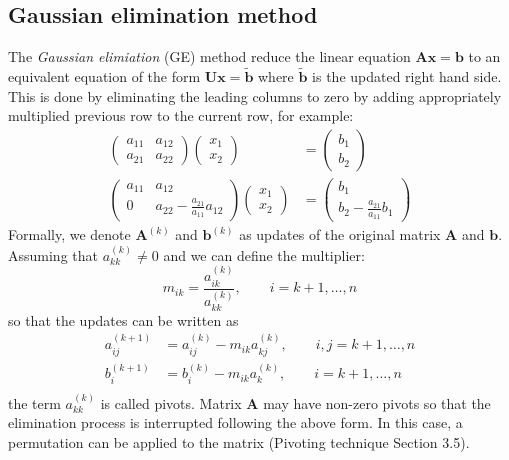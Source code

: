 \documentclass{article}
\begin{document}
\subsection{Gaussian elimination method}
The \emph{Gaussian elimiation} (GE) method reduce the linear equation 
$\mathbf{A}\mathbf{x} = \mathbf{b}$ to an equivalent equation 
of the form $\mathbf{U}\mathbf{x} = \tilde{\mathbf{b}}$ where $\tilde{\mathbf{b}}$
is the updated right hand side. 
This is done by eliminating the leading columns to zero by adding appropriately multiplied 
previous row to the current row, for example:
\begin{align*}
    \left(\begin{matrix}
        a_{11} & a_{12} \\
        a_{21} & a_{22} 
    \end{matrix}\right)
    \left(\begin{matrix}
        x_1 \\ x_2
    \end{matrix}\right) &= 
    \left(\begin{matrix}
        b_1 \\ b_2
    \end{matrix}\right) \\
    \left(\begin{matrix}
        a_{11} & a_{12} \\
        0 & a_{22} - \frac{a_{21}}{a_{11}} a_{12}
    \end{matrix}\right)
    \left(\begin{matrix}
        x_1 \\ x_2
    \end{matrix}\right) &= 
    \left(\begin{matrix}
        b_1 \\ b_2 - \frac{a_{21}}{a_{11}} b_1
    \end{matrix}\right)
\end{align*}
Formally, we denote $\mathbf{A}^{(k)}$ and $\mathbf{b}^{(k)}$ as updates of the 
original matrix $\mathbf{A}$ and $\mathbf{b}$. Assuming that $a_{kk}^{(k)}\neq 0$ and 
we can define the multiplier:
\begin{equation}
    m_{ik} = \frac{a_{ik}^{(k)}}{a_{kk}^{(k)}} 
    ,\qquad i = k+1, \dots, n
\end{equation}
so that the updates can be written as
\begin{align*}
    a_{ij}^{(k+1)} &= a_{ij}^{(k)} - m_{ik}a_{kj}^{(k)}
    ,\qquad i,j = k+1, \dots, n \\
    b_{i}^{(k+1)} &= b_{i}^{(k)} - m_{ik}a_{k}^{(k)}
    ,\qquad i = k+1, \dots, n \\
\end{align*}
the term $a_{kk}^{(k)}$ is called pivots. Matrix $\mathbf{A}$ may have non-zero pivots so 
that the elimination process is interrupted following the above form. In this case, a 
permutation can be applied to the matrix (Pivoting technique Section 3.5).
\end{document}
